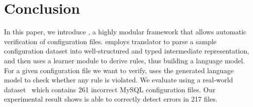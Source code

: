 
\section{Conclusion}

In this paper, we introduce \app, a highly modular framework 
that allows automatic verification of configuration files.
\app employs translator to parse a sample configuration dataset
into well-structured and typed intermediate representation,
and then uses a learner module to derive rules, 
thus building a language model.
For a given configuration file we want to verify,
\app uses the generated language model to check
whether any rule is violated.
We evaluate \app using a real-world dataset~\cite{configdataset}
which contains 261 incorrect MySQL configuration files.
Our experimental result shows \app is able to
correctly detect errors in 217 files.

